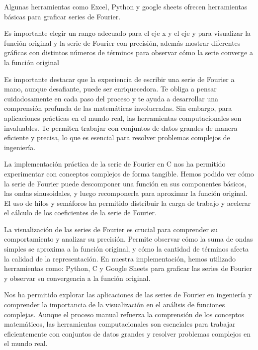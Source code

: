 Algunas herramientas como Excel, Python y google sheets ofrecen herramientas básicas para graficar series de Fourier.

Es importante elegir un rango adecuado para el eje x y el eje y para visualizar la función original y la serie de Fourier con precisión, además mostrar diferentes gráficas con distintos números de términos para observar cómo la serie converge a la función original

Es importante destacar que la experiencia de escribir una serie de Fourier a mano, aunque desafiante, puede ser enriquecedora. Te obliga a pensar cuidadosamente en cada paso del proceso y te ayuda a desarrollar una comprensión profunda de las matemáticas involucradas. Sin embargo, para aplicaciones prácticas en el mundo real, las herramientas computacionales son invaluables. Te permiten trabajar con conjuntos de datos grandes de manera eficiente y precisa, lo que es esencial para resolver problemas complejos de ingeniería.

La implementación práctica de la serie de Fourier en C nos ha permitido experimentar con conceptos complejos de forma tangible. Hemos podido ver cómo la serie de Fourier puede descomponer una función en sus componentes básicos, las ondas sinusoidales, y luego recomponerla para aproximar la función original. El uso de hilos y semáforos ha permitido distribuir la carga de trabajo y acelerar el cálculo de los coeficientes de la serie de Fourier.

La visualización de las series de Fourier es crucial para comprender su comportamiento y analizar su precisión. Permite observar cómo la suma de ondas simples se aproxima a la función original, y cómo la cantidad de términos afecta la calidad de la representación. En nuestra implementación, hemos utilizado herramientas como: Python, C y Google Sheets para graficar las series de Fourier y observar su convergencia a la función original.

Nos ha permitido explorar las aplicaciones de las series de Fourier en ingeniería y comprender la importancia de la visualización en el análisis de funciones complejas. Aunque el proceso manual refuerza la comprensión de los conceptos matemáticos, las herramientas computacionales son esenciales para trabajar eficientemente con conjuntos de datos grandes y resolver problemas complejos en el mundo real.

